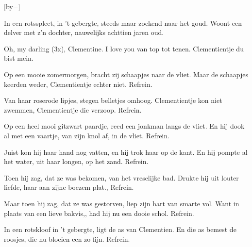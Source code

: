  

[by=]



\beginverse
In een rotsspleet, in 't gebergte, \brk  steeds maar zoekend naar het goud.
Woont een delver met z'n dochter, \brk  nauwelijks achttien jaren oud.
\endverse

\beginchorus
Oh, my darling (3x), Clementine.
I love you van top tot tenen.
Clementientje du bist mein.
\endchorus

\beginverse
Op een mooie zomermorgen, \brk  bracht zij schaapjes naar de vliet.
Maar de schaapjes keerden weder, \brk  Clementientje echter niet. Refrein.
\endverse

\beginverse
Van haar roserode lipjes, \brk  stegen belletjes omhoog.
Clementientje kon niet zwemmen, \brk  Clementientje die verzoop. Refrein.
\endverse

\beginverse
Op een heel mooi gitzwart paardje, \brk  reed een jonkman langs de vliet.
En hij dook al met een vaartje, \brk  van zijn knol af, in de vliet. Refrein.
\endverse

\beginverse
Juist kon hij haar hand nog vatten, \brk  en hij trok haar op de kant.
En hij pompte al het water, \brk  uit haar longen, op het zand. Refrein.
\endverse

\beginverse
Toen hij zag, dat ze was bekomen, \brk  van het vreselijke bad.
Drukte hij uit louter liefde, \brk  haar aan zijne boezem plat., Refrein.
\endverse

\beginverse
Maar toen hij zag, dat ze was gestorven, \brk  liep zijn hart van smarte vol.
Want in plaats van een lieve bakvis,, \brk  had hij nu een dooie schol. Refrein.
\endverse

\beginverse
In een rotskloof in 't gebergte, \brk  ligt de as van Clementien.
En die as bemest de roosjes, \brk  die nu bloeien een zo fijn. Refrein.
\endverse




\endsong
